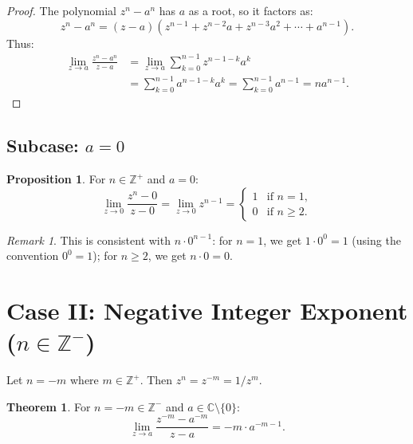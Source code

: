 \documentclass{article}
\theoremstyle{definition}
\newtheorem{theorem}{Theorem}[section]
\newtheorem{proposition}{Proposition}[section]
\theoremstyle{remark}
\newtheorem{remark}{Remark}[section]
\newcommand{\C}{\mathbb{C}}
\newcommand{\Z}{\mathbb{Z}}
\begin{document}
\begin{proof}
The polynomial $z^n - a^n$ has $a$ as a root, so it factors as:
\begin{equation}
z^n - a^n = (z - a)(z^{n-1} + z^{n-2}a + z^{n-3}a^2 + \cdots + a^{n-1}).
\end{equation}
Thus:
\begin{align}
\lim_{z \to a} \frac{z^n - a^n}{z - a} &= \lim_{z \to a} \sum_{k=0}^{n-1} z^{n-1-k} a^k \\
&= \sum_{k=0}^{n-1} a^{n-1-k} a^k = \sum_{k=0}^{n-1} a^{n-1} = n a^{n-1}.
\end{align}
\end{proof}

\subsection{Subcase: $a = 0$}

\begin{proposition}
For $n \in \Z^+$ and $a = 0$:
\begin{equation}
\lim_{z \to 0} \frac{z^n - 0}{z - 0} = \lim_{z \to 0} z^{n-1} = 
\begin{cases}
1 & \text{if } n = 1, \\
0 & \text{if } n \geq 2.
\end{cases}
\end{equation}
\end{proposition}

\begin{remark}
This is consistent with $n \cdot 0^{n-1}$: for $n = 1$, we get $1 \cdot 0^0 = 1$ (using the convention $0^0 = 1$); for $n \geq 2$, we get $n \cdot 0 = 0$.
\end{remark}

\section{Case II: Negative Integer Exponent ($n \in \Z^-$)}

Let $n = -m$ where $m \in \Z^+$. Then $z^n = z^{-m} = 1/z^m$.

\begin{theorem}
For $n = -m \in \Z^-$ and $a \in \C \setminus \{0\}$:
\begin{equation}
\lim_{z \to a} \frac{z^{-m} - a^{-m}}{z - a} = -m \cdot a^{-m-1}.
\end{equation}
\end{theorem}
\end{document}
